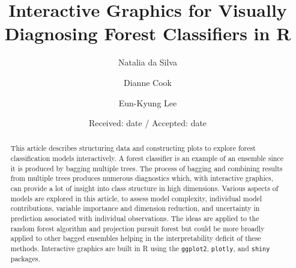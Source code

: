 \documentclass[smallextended,natbib]{svjour3}\usepackage[]{graphicx}\usepackage[]{xcolor}
\begin{document}
\title{Interactive Graphics for Visually Diagnosing Forest Classifiers in R} 


\author{Natalia da Silva \and
        Dianne Cook\and
        Eun-Kyung Lee}




\date{Received: date / Accepted: date}

\maketitle

\begin{abstract}
This article describes structuring data and constructing plots to explore forest classification models interactively. A forest classifier is an example of an ensemble since it is produced by bagging multiple trees. The process of bagging and combining results from multiple trees produces numerous diagnostics which, with interactive graphics, can provide a lot of insight into class structure in high dimensions. Various aspects of models are explored in this article, to assess model complexity, individual model contributions, variable importance and dimension reduction, and uncertainty in prediction associated with individual observations. The ideas are applied to the random forest algorithm and projection pursuit forest but could be more broadly applied to other bagged ensembles helping in the interpretability deficit of these methods. Interactive graphics are built in R using the \texttt{ggplot2}, \texttt{plotly}, and \texttt{shiny} packages.
\end{abstract}
\end{document}
